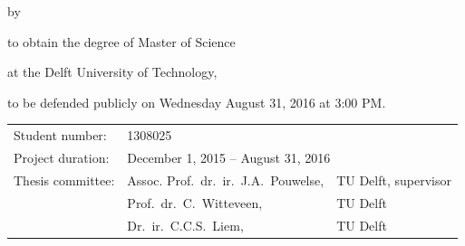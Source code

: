 \begin{titlepage}


\begin{center}


{\makeatletter
\largetitlestyle\fontsize{64}{94}\selectfont\@title
\makeatother}

{\makeatletter
\ifx\@subtitle\undefined\else
    \bigskip
   {\tudsffamily\fontsize{22}{32}\selectfont\@subtitle}    
\fi
\makeatother}

\bigskip
\bigskip

by

\bigskip
\bigskip

{\makeatletter
\largetitlestyle\fontsize{26}{26}\selectfont\@author
\makeatother}

\bigskip
\bigskip

to obtain the degree of Master of Science

at the Delft University of Technology,

to be defended publicly on Wednesday August 31, 2016 at 3:00 PM.

\vfill





\begin{tabular}{lll}
    Student number: & 1308025 \\
    Project duration: & \multicolumn{2}{l}{December 1, 2015 -- August 31, 2016} \\
    Thesis committee: & Assoc. Prof.\ dr.\ ir.\ J.A.\ Pouwelse, & TU Delft, supervisor \\
        & Prof.\ dr.\ C.\ Witteveen, & TU Delft \\
        & Dr.\ ir.\ C.C.S.\ Liem, & TU Delft
\end{tabular}


\end{center}
\end{titlepage}
